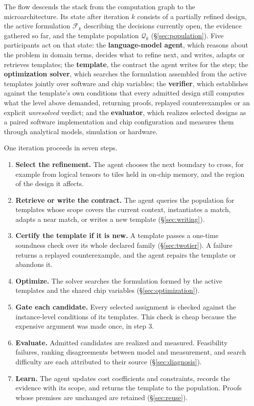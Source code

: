 \documentclass[11pt]{article}
\providecommand{\tightlist}{\setlength{\itemsep}{0pt}\setlength{\parskip}{0pt}}
\begin{document}
The flow descends the stack from the computation graph to the microarchitecture. Its state after iteration \(k\) consists of a partially refined design, the active formulation \(\mathcal F_k\) describing the decisions currently open, the evidence gathered so far, and the template population \(\mathcal Q_k\) (§\ref{sec:population}). Five participants act on that state: the \textbf{language-model agent}, which reasons about the problem in domain terms, decides what to refine next, and writes, adapts or retrieves templates; the \textbf{template}, the contract the agent writes for the step; the \textbf{optimization solver}, which searches the formulation assembled from the active templates jointly over software and chip variables; the \textbf{verifier}, which establishes against the template's own conditions that every admitted design still computes what the level above demanded, returning proofs, replayed counterexamples or an explicit \emph{unresolved} verdict; and the \textbf{evaluator}, which realizes selected designs as a paired software implementation and chip configuration and measures them through analytical models, simulation or hardware.

One iteration proceeds in seven steps.

\begin{enumerate}
\tightlist
\item \textbf{Select the refinement.} The agent chooses the next boundary to cross, for example from logical tensors to tiles held in on-chip memory, and the region of the design it affects.
\item \textbf{Retrieve or write the contract.} The agent queries the population for templates whose scope covers the current context, instantiates a match, adapts a near match, or writes a new template (§\ref{sec:writing}).
\item \textbf{Certify the template if it is new.} A template passes a one-time soundness check over its whole declared family (§\ref{sec:twotier}). A failure returns a replayed counterexample, and the agent repairs the template or abandons it.
\item \textbf{Optimize.} The solver searches the formulation formed by the active templates and the shared chip variables (§\ref{sec:optimization}).
\item \textbf{Gate each candidate.} Every selected assignment is checked against the instance-level conditions of its templates. This check is cheap because the expensive argument was made once, in step 3.
\item \textbf{Evaluate.} Admitted candidates are realized and measured. Feasibility failures, ranking disagreements between model and measurement, and search difficulty are each attributed to their source (§\ref{sec:diagnosis}).
\item \textbf{Learn.} The agent updates cost coefficients and constraints, records the evidence with its scope, and returns the template to the population. Proofs whose premises are unchanged are retained (§\ref{sec:reuse}).
\end{enumerate}
\end{document}
